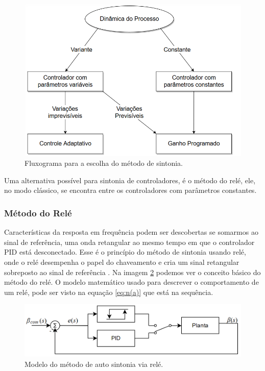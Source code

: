 \begin{figure}[H]
  \caption{Fluxograma para a escolha do método de sintonia.}
  \begin{center}
      \includegraphics[scale=0.55]{referencial/img/escolha_controle_astrom_p236}
  \end{center}
  \label{fig:escolha_controle_astrom_p236}
\end{figure}

Uma alternativa possível para sintonia de controladores, é o método do relé, ele, no modo clássico, se encontra entre os controladores com parâmetros constantes.



\subsubsection{Método do Relé}

Características da resposta em frequência podem ser descobertas se somarmos ao sinal de referência, uma onda retangular ao mesmo tempo em que o controlador PID está desconectado. Esse é o princípio do método de sintonia usando relé, onde o relé desempenha o papel do chaveamento e cria um sinal retangular sobreposto ao sinal de referência \cite{Levine1996}. Na imagem \ref{fig:pid_autotuning_relay_astrom_p239} podemos ver o conceito básico do método do relé. O modelo matemático usado para descrever o comportamento de um relé, pode ser visto na equação \ref{eq:n(a)} que está na sequência.
 
\begin{figure}[H]
  \caption{Modelo do método de auto sintonia via relé.}
  \begin{center}
      \includegraphics[scale=0.55]{referencial/img/pid_autotuning_relay_astrom_p239}
  \end{center}
  \label{fig:pid_autotuning_relay_astrom_p239}
\end{figure}

